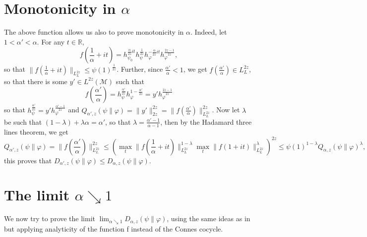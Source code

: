 \documentclass[12pt]{article}
\theoremstyle{definition}
\theoremstyle{remark}
\def\Me{\mathcal M}
\begin{document}
\section{Monotonicity in $\alpha$}


 The above function  allows us also to prove monotonicity in $\alpha$. Indeed,
let $1<\alpha'<\alpha$. For any $t\in \mathbb R$,
\[
f(\frac1{\alpha}+it)=h_{\psi_0}^{\frac{\alpha}{2z}it}h_\psi^{\frac{1}{2z}}h_\varphi^{-\frac{\alpha}{2z}it}h_\varphi^{\frac{2z-1}{2z}},
\]
so that $\|f(\frac1{\alpha}+it)\|_{L^{2z}_L}\le \psi(1)^{\frac1{2z}}$. Further, since
$\frac{\alpha'}{\alpha}<1$, we get $f(\frac{\alpha'}{\alpha})\in L^{2z}_L$, so that there is some $y'\in
L^{2z}(\Me)$ such that 
\[
f(\frac{\alpha'}{\alpha})=h_\psi^{\frac{\alpha'}{2z}}h_\varphi^{1-\frac{\alpha'}{2z}}=y'h_\varphi^{\frac{2z-1}{2z}}
\]
so that $h_\psi^{\frac{\alpha'}{2z}}=y'h_\varphi^{\frac{\alpha'-1}{2z}}$ and
$Q_{\alpha',z}(\psi\|\varphi)=\|y'\|^{2z}_{2z}=\|f(\frac{\alpha'}{\alpha})\|_{L^{2z}_L}^{2z}$. Now let $\lambda$ be such that
$(1-\lambda)+\lambda \alpha=\alpha'$, so that $\lambda=\frac{\alpha'-1}{\alpha-1}$, then
by the Hadamard three lines theorem, we get
\[
Q_{\alpha',z}(\psi\|\varphi)=\|f(\frac{\alpha'}{\alpha})\|^{2z}_{L^{2z}_L}\le \left(\max_t
\|f(\frac1{\alpha}+it)\|_{L^{2z}_L}^{1-\lambda}\max_t\|f(1+it)\|_{L^{2z}_L}^\lambda\right)^{2z}\le
\psi(1)^{1-\lambda}Q_{\alpha,z}(\psi\|\varphi)^\lambda,
\]
this proves that $D_{\alpha',z}(\psi\|\varphi)\le D_{\alpha,z}(\psi\|\varphi)$. 

\section{The limit $\alpha\searrow 1$}

 We now try to prove the limit $\lim_{\alpha \searrow 1}
D_{\alpha,z}(\psi\|\varphi)$, using the same  ideas as in  \cite{FHnote7} but applying  analyticity of
the function f instead of the Connes cocycle.
\end{document}
